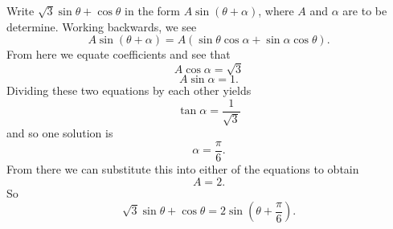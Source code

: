 Write $\sqrt{3}\sin\theta + \cos\theta$ in the form $A\sin(\theta + \alpha)$, where $A$ and $\alpha$ are to be determine.
\newline
Working backwards, we see
\[
A\sin(\theta + \alpha) = A(\sin\theta\cos\alpha + \sin\alpha\cos\theta).
\]
From here we equate coefficients and see that
\[
A\cos\alpha = \sqrt{3}
\]
\[
A \sin \alpha = 1.
\]
Dividing these two equations by each other yields
\[
\tan \alpha = \frac{1}{\sqrt{3}}
\]
and so one solution is 
\[
\alpha = \frac{\pi}{6}.
\]
From there we can substitute this into either of the equations to obtain
\[
A = 2.
\]
So
\[
\sqrt{3}\sin\theta + \cos\theta = 2\sin\left(\theta + \frac{\pi}{6}\right).
\]